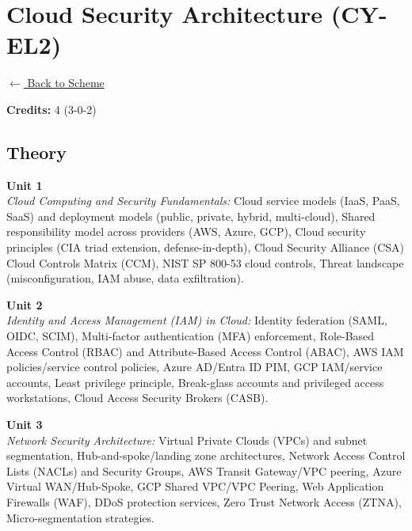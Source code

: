 \section*{Cloud Security Architecture (CY-EL2)}
\label{elec:CY_2}

\noindent \small{\hyperref[main:scheme]{$\leftarrow$ Back to Scheme}} \vspace{0.5cm}

\noindent \textbf{Credits:} 4 (3-0-2)

\subsection*{Theory}
\noindent\textbf{Unit 1} \\
\textit{Cloud Computing and Security Fundamentals:} Cloud service models (IaaS, PaaS, SaaS) and deployment models (public, private, hybrid, multi-cloud), Shared responsibility model across providers (AWS, Azure, GCP), Cloud security principles (CIA triad extension, defense-in-depth), Cloud Security Alliance (CSA) Cloud Controls Matrix (CCM), NIST SP 800-53 cloud controls, Threat landscape (misconfiguration, IAM abuse, data exfiltration).

\vspace{0.3cm}

\noindent\textbf{Unit 2} \\
\textit{Identity and Access Management (IAM) in Cloud:} Identity federation (SAML, OIDC, SCIM), Multi-factor authentication (MFA) enforcement, Role-Based Access Control (RBAC) and Attribute-Based Access Control (ABAC), AWS IAM policies/service control policies, Azure AD/Entra ID PIM, GCP IAM/service accounts, Least privilege principle, Break-glass accounts and privileged access workstations, Cloud Access Security Brokers (CASB).

\vspace{0.3cm}

\noindent\textbf{Unit 3} \\
\textit{Network Security Architecture:} Virtual Private Clouds (VPCs) and subnet segmentation, Hub-and-spoke/landing zone architectures, Network Access Control Lists (NACLs) and Security Groups, AWS Transit Gateway/VPC peering, Azure Virtual WAN/Hub-Spoke, GCP Shared VPC/VPC Peering, Web Application Firewalls (WAF), DDoS protection services, Zero Trust Network Access (ZTNA), Micro-segmentation strategies.

\vspace{0.3cm}

